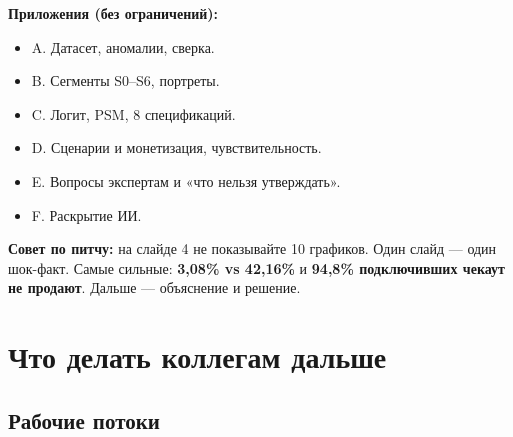 \documentclass[10pt,a4paper]{article}
\begin{document}
\noindent\textbf{Приложения (без ограничений):}\par\vspace{4pt}

\begin{itemize}[leftmargin=1.35em,itemsep=2pt,topsep=3pt,parsep=0pt]
\item A. Датасет, аномалии, сверка.
\item B. Сегменты S0–S6, портреты.
\item C. Логит, PSM, 8 спецификаций.
\item D. Сценарии и монетизация, чувствительность.
\item E. Вопросы экспертам и «что нельзя утверждать».
\item F. Раскрытие ИИ.
\end{itemize}

\textbf{Совет по питчу:} на слайде 4 не показывайте 10 графиков. Один слайд — один шок-факт. Самые сильные: \textbf{3,08\% vs 42,16\%} и \textbf{94,8\% подключивших чекаут не продают}. Дальше — объяснение и решение.\par

\clearpage

\section{Что делать коллегам дальше}

\subsection{Рабочие потоки}
\end{document}
